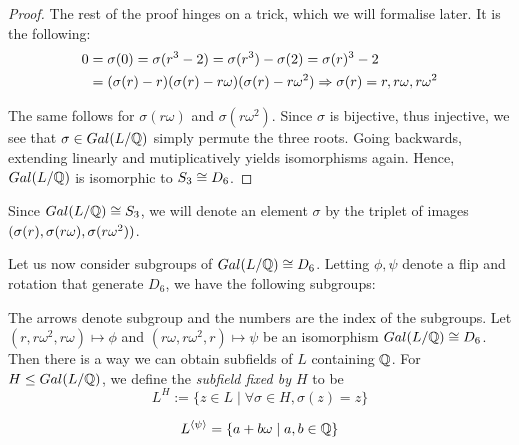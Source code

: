 \documentclass[../book.tex]{subfiles}
\begin{document}
\begin{eg}
\begin{proof}
    The rest of the proof hinges on a trick, which we will formalise later. 
    It is the following: 
    \begin{align*}
        0 &= \sigma(0) = \sigma(r^3 - 2) 
            = \sigma(r^3) - \sigma(2) = \sigma(r)^3 - 2 \\
        &= (\sigma(r) - r) (\sigma(r) - r\omega) (\sigma(r) - r\omega^2) 
            \Rightarrow \sigma(r) = r, r\omega, r\omega^2 
    \end{align*}

    The same follows for $\sigma(r\omega)$ and $\sigma(r\omega^2)$. 
    Since $\sigma$ is bijective, thus injective,  
    we see that $\sigma \in Gal(L/\mathbb{Q})$ simply permute the three roots. 
    Going backwards, extending linearly and mutiplicatively yields 
    isomorphisms again. 
    Hence, $Gal(L/\mathbb{Q})$ is isomorphic to $S_3 \cong D_6$.  
\end{proof}
Since $Gal(L/\mathbb{Q}) \cong S_3$, 
we will denote an element $\sigma$ by the triplet of images 
$(\sigma(r), \sigma(r\omega), \sigma(r\omega^2) )$.

Let us now consider subgroups of $Gal(L/\mathbb{Q}) \cong D_6$.
Letting $\phi, \psi$ denote a flip and rotation that generate $D_6$, 
we have the following subgroups: 
\begin{figure}[ht]
    \centering
\end{figure}

The arrows denote subgroup and the numbers are the index of the subgroups. 
Let $(r, r\omega^2, r\omega) \mapsto \phi$ and 
$(r\omega,r\omega^2,r) \mapsto \psi$ be an isomorphism $Gal(L/\mathbb{Q}) \cong D_6$. 
Then there is a way we can obtain subfields of $L$ containing $\mathbb{Q}$. 
For $H \leq Gal(L/\mathbb{Q})$, we define the \emph{subfield fixed by $H$} to be
\[L^H := \{z \in L \mid \forall \sigma \in H, \sigma(z) = z\} \]

\begin{clm}
    \[ L^{\langle \psi \rangle} = 
    \{ a + b\omega \mid a, b \in \mathbb{Q} \}\]
\end{clm}


\end{eg}
\end{document}
